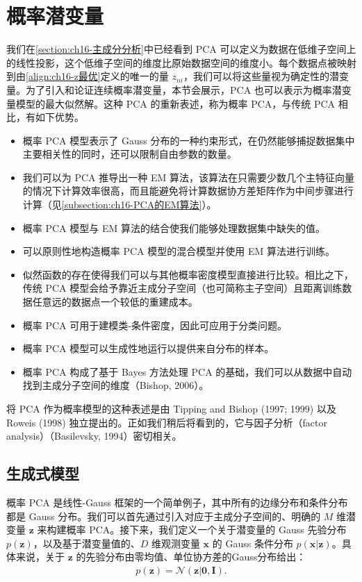 \documentclass[../../main.tex]{subfiles}
\begin{document}
\section{概率潜变量}\label{section:ch16-概率潜变量}

我们在\cref{section:ch16-主成分分析}中已经看到 PCA 可以定义为数据在低维子空间上的线性投影，这个低维子空间的维度比原始数据空间的维度小。每个数据点被映射到由\eqref{align:ch16-z最优}定义的唯一的量 $z_{ni}$，我们可以将这些量视为确定性的潜变量。为了引入和论证连续概率潜变量，本节会展示，PCA 也可以表示为概率潜变量模型的最大似然解。这种 PCA 的重新表述，称为概率 PCA，与传统 PCA 相比，有如下优势。
\begin{itemize}
  \item 概率 PCA 模型表示了 Gauss 分布的一种约束形式，在仍然能够捕捉数据集中主要相关性的同时，还可以限制自由参数的数量。
  \item 我们可以为 PCA 推导出一种 EM 算法，该算法在只需要少数几个主特征向量的情况下计算效率很高，而且能避免将计算数据协方差矩阵作为中间步骤进行计算（见\cref{subsection:ch16-PCA的EM算法}）。
  \item 概率 PCA 模型与 EM 算法的结合使我们能够处理数据集中缺失的值。
  \item 可以原则性地构造概率 PCA 模型的混合模型并使用 EM 算法进行训练。
  \item 似然函数的存在使得我们可以与其他概率密度模型直接进行比较。相比之下，传统 PCA 模型会给予靠近主成分子空间（也可简称主子空间）且距离训练数据任意远的数据点一个较低的重建成本。
  \item 概率 PCA 可用于建模类-条件密度，因此可应用于分类问题。
  \item 概率 PCA 模型可以生成性地运行以提供来自分布的样本。
  \item 概率 PCA 构成了基于 Bayes 方法处理 PCA 的基础，我们可以从数据中自动找到主成分子空间的维度（Bishop, 2006）。
\end{itemize}

将 PCA 作为概率模型的这种表述是由 Tipping and Bishop (1997; 1999) 以及 Roweis (1998) 独立提出的。正如我们稍后将看到的，它与因子分析（factor analysis）（Basilevsky, 1994）密切相关。

\subsection{生成式模型}\label{subsection:ch16-生成式模型}

概率 PCA 是线性-Gauss 框架的一个简单例子，其中所有的边缘分布和条件分布都是 Gauss 分布。我们可以首先通过引入对应于主成分子空间的、明确的 $M$ 维潜变量 $\bm{z}$ 来构建概率 PCA。接下来，我们定义一个关于潜变量的 Gauss 先验分布 $p(\bm{z})$，以及基于潜变量值的、$D$ 维观测变量 $\bm{x}$ 的 Gauss 条件分布 $p(\bm{x}|\bm{z})$。具体来说，关于 $\bm{z}$ 的先验分布由零均值、单位协方差的Gauss分布给出：
\begin{align}
  p(\bm{z})=\mathcal{N}(\bm{z}|\bm{0},\bm{I}).
  \label{align:ch16-先验}
\end{align}
\end{document}
